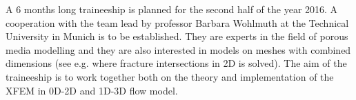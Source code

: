 \documentclass[bibliography=totocnumbered,dvipsnames,FM,Dis,EN]{tulthesis}
\begin{document}

A 6 months long traineeship is planned for the second half of the year 2016. A cooperation with the team lead
by professor Barbara Wohlmuth at the Technical University in Munich is to be established. They are experts
in the field of porous media modelling and they are also interested in models on meshes with combined dimensions
(see e.g. \cite{schwenck_2015} where fracture intersections in 2D is solved). The aim of the traineeship is to
work together both on the theory and implementation of the XFEM in 0D-2D and 1D-3D flow model.



{\small

% 

}
\end{document}
